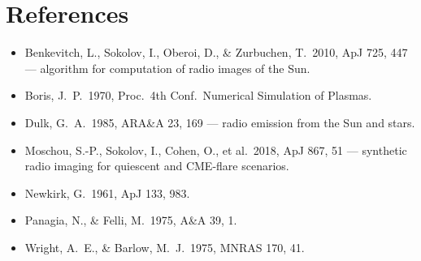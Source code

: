 \documentclass[11pt,a4paper]{article}
\begin{document}
\section*{References}
\begin{small}
\begin{itemize}[leftmargin=1.2em,itemsep=1pt]
\item Benkevitch, L., Sokolov, I., Oberoi, D., \& Zurbuchen, T.\ 2010, ApJ 725, 447 ---
      algorithm for computation of radio images of the Sun.
\item Boris, J.\ P.\ 1970, Proc.\ 4th Conf.\ Numerical Simulation of Plasmas.
\item Dulk, G.\ A.\ 1985, ARA\&A 23, 169 --- radio emission from the Sun and stars.
\item Moschou, S.-P., Sokolov, I., Cohen, O., et al.\ 2018, ApJ 867, 51 --- synthetic radio
      imaging for quiescent and CME-flare scenarios.
\item Newkirk, G.\ 1961, ApJ 133, 983.
\item Panagia, N., \& Felli, M.\ 1975, A\&A 39, 1.
\item Wright, A.\ E., \& Barlow, M.\ J.\ 1975, MNRAS 170, 41.
\end{itemize}
\end{small}
\end{document}
